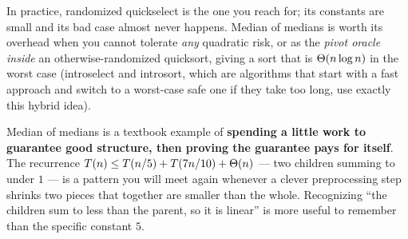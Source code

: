 In practice, randomized quickselect is the one you reach for; its constants are
small and its bad case almost never happens. Median of medians is worth its overhead
when you cannot tolerate \emph{any} quadratic risk, or as the
\emph{pivot oracle inside} an otherwise-randomized quicksort, giving a sort that is
$\Theta(n\log n)$ in the worst case (introselect and introsort, which are algorithms that start with a fast approach and switch to a worst-case safe one if they take too long, use exactly this hybrid idea).

\begin{aestheticbox}
Median of medians is a textbook example of \textbf{spending a little work to guarantee good structure, then proving the
guarantee pays for itself}. The recurrence $T(n) \le T(n/5) + T(7n/10) + \Theta(n)$ ---
two children summing to under $1$ --- is a pattern you will meet again whenever a
clever preprocessing step shrinks two pieces that together are smaller than the
whole. Recognizing ``the children sum to less than the parent, so it is linear'' is
more useful to remember than the specific constant $5$.
\end{aestheticbox}

